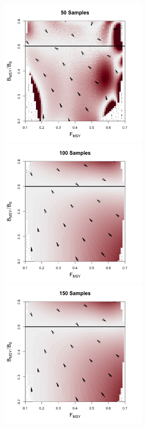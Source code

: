 {\begin{figure}[h!]
\begin{minipage}[h!]{0.49\textwidth}
\includegraphics[width=0.65\textwidth]{../edits/directionalBiasSubPTFlatT30nF6.png}\\
\includegraphics[width=0.65\textwidth]{../edits/directionalBiasSubPTFlatT30nF3.png}\\
\includegraphics[width=0.65\textwidth]{../edits/directionalBiasSubPTFlatT30nF1.png}\\

\end{minipage}
\end{figure}}
